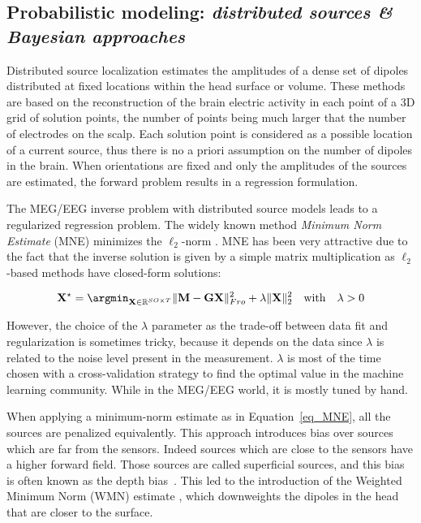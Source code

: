 \subsection{Probabilistic modeling: \textit{distributed sources \& Bayesian approaches}} \label{section_distributed}
Distributed source localization estimates the amplitudes of a dense set of dipoles distributed at fixed locations within the head surface or volume. These methods are based on the reconstruction of the brain electric activity in each point of a 3D grid of solution points, the number of points being much larger that the number of electrodes on the scalp. Each solution point is considered as a possible location of a current source, thus there is no a priori assumption on the number of dipoles in the brain.
When orientations are fixed and only the amplitudes of the sources are estimated, the forward problem results in a regression formulation.

The MEG/EEG inverse problem with distributed source models leads to a regularized regression problem. The widely known method \textit{Minimum Norm Estimate} (MNE) minimizes the $\ell_2$-norm \cite{hamalainen1994interpreting}. %
MNE has been very attractive due to the fact that the inverse solution is given by a simple matrix multiplication as $\ell_2$-based methods have closed-form solutions:

\begin{equation}\label{eq_MNE}
\mathbf{X}^\star = \argmin_{\mathbf{X}\in\RR^{SO\times T}} \|\mathbf{M}-\mathbf{GX}\|_{Fro}^2 + \lambda\|\mathbf{X}\|_2^2 \hspace{10pt} \mathrm{with} \hspace{10pt} \lambda > 0
\end{equation}

However, the choice of the $\lambda$ parameter as the trade-off between data fit and regularization is sometimes tricky, because it depends on the data since $\lambda$ is related to the noise level present in the measurement. $\lambda$ is most of the time chosen with a cross-validation strategy to find the optimal value in the machine learning community. While in the MEG/EEG world, it is mostly tuned by hand.

When applying a minimum-norm estimate as in Equation~\eqref{eq_MNE}, all the sources are penalized equivalently. This approach introduces bias over sources which are far from the sensors. Indeed sources which are close to the sensors have a higher forward field. Those sources are called superficial sources, and this bias is often known as the depth bias~\cite{pascual1999review}. This led to the introduction of the Weighted Minimum Norm (WMN) estimate \cite{lin2006assessing}, which downweights the dipoles in the head that are closer to the surface. 

